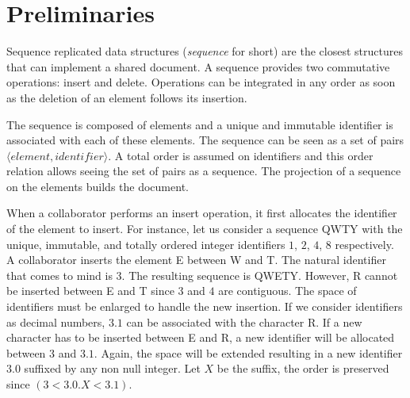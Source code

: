 
\section{Preliminaries}
\label{sec:preliminaries}


Sequence replicated data structures (\emph{sequence} for short) are the closest
structures that can implement a shared document. A sequence provides two
commutative operations: insert and delete. Operations can be integrated in any
order as soon as the deletion of an element follows its insertion.

The sequence is composed of elements and a unique and immutable identifier is
associated with each of these elements. The sequence can be seen as a set of
pairs $\langle element, identifier \rangle$. A total order is assumed on
identifiers and this order relation allows seeing the set of pairs as a
sequence. The projection of a sequence on the elements builds the document.

When a collaborator performs an insert operation, it first allocates the
identifier of the element to insert. For instance, let us consider a sequence
QWTY with the unique, immutable, and totally ordered integer identifiers $1$,
$2$, $4$, $8$ respectively. A collaborator inserts the element E between W
and T. The natural identifier that comes to mind is $3$. The resulting
sequence is QWETY. However, R cannot be inserted between E and T since
$3$ and $4$ are contiguous. The space of identifiers must be enlarged to handle
the new insertion. If we consider identifiers as decimal numbers, $3.1$ can be
associated with the character R. If a new character has to be inserted
between E and R, a new identifier will be allocated between $3$ and
$3.1$. Again, the space will be extended resulting in a new identifier $3.0$
suffixed by any non null integer. Let $X$ be the suffix, the order is preserved
since $(3 < 3.0.X < 3.1)$.

